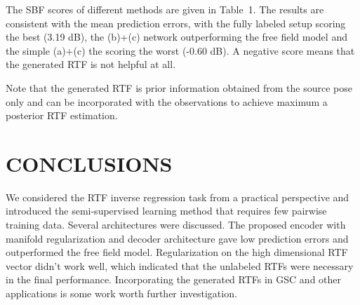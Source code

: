 \documentclass{article}
\begin{document}
The SBF scores of different methods are given in Table~1. The results are consistent with the mean prediction errors, with the fully labeled setup scoring the best (3.19 dB), the (b)+(c) network outperforming the free field model and the simple (a)+(c) the scoring the worst (-0.60 dB). A negative score means that the generated RTF is not helpful at all.

Note that the generated RTF is prior information obtained from the source pose only and can be incorporated with the observations to achieve maximum a posterior RTF estimation.


\section{CONCLUSIONS}
\label{sec:con}

We considered the RTF inverse regression task from a practical perspective and introduced the semi-supervised learning method that requires few pairwise training data. Several architectures were discussed. The proposed encoder with manifold regularization and decoder architecture gave low prediction errors and outperformed the free field model. Regularization on the high dimensional RTF vector didn't work well, which indicated that the unlabeled RTFs were necessary in the final performance. Incorporating the generated RTFs in GSC and other applications is some work worth further investigation.


%
%
%
\end{document}
